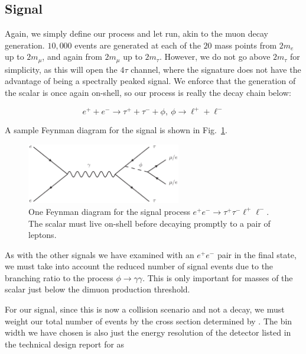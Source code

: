 \subsection{Signal}
Again, we simply define our process and let \madgraph run, akin to the muon decay generation.
$10,000$ events are generated at each of the $20$ mass points from $2m_e$ up to $2m_\mu$, and again from $2m_\mu$ up to $2m_\tau$.
However, we do not go above $2m_\tau$ for simplicity, as this will open the $4\tau$ channel, where the signature does not have the advantage of being a spectrally peaked signal. 
We enforce that the generation of the scalar is once again on-shell, so our process is really the decay chain below:

\begin{equation}
    e^+ + e^- \rightarrow \tau^+ + \tau^- + \phi,~\phi \rightarrow \ell^+ + \ell^-
\end{equation}

A sample Feynman diagram for the signal is shown in Fig.~\ref{fig:ee_tautaull_scalar}.

\begin{figure}[h]
    \centering
    \includegraphics[width=0.6\textwidth]{Figures/feynman_diagrams/ee_tautaull_scalar}
    \caption{One Feynman diagram for the signal process $e^+ e^- \rightarrow \tau^+ \tau^- \ell^+ \ell^-$. The scalar must live on-shell before decaying promptly to a pair of leptons.}
    \label{fig:ee_tautaull_scalar}
\end{figure}

As with the other signals we have examined with an $e^+ e^-$ pair in the final state, we must take into account the reduced number of signal events due to the branching ratio to the process $\phi \rightarrow \gamma \gamma$.
This is only important for masses of the scalar just below the dimuon production threshold.

For our signal, since this is now a collision scenario and not a decay, we must weight our total number of events by the cross section determined by \madgraph.
The bin width we have chosen is also just the energy resolution of the detector listed in the technical design report for \belletwo \cite{Abe:2010gxa} as

